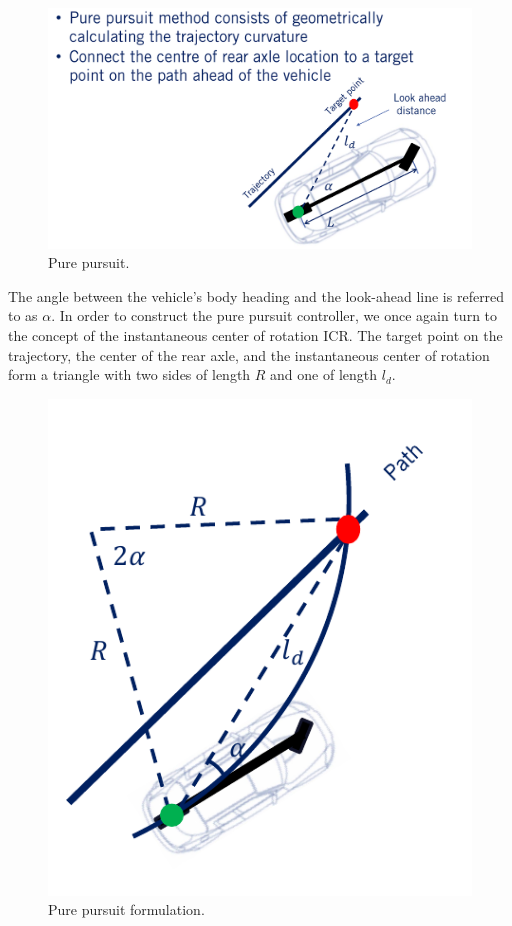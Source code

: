\begin{figure}[!htb]
\begin{center}
\includegraphics[scale=0.280]{img/lateral_control/pure_pursuit.jpeg}
\end{center}
\caption{Pure pursuit.}
\label{pure_pursuit}
\end{figure}

The angle between the vehicle's body heading and the look-ahead line is referred to as $\alpha$. In order to construct the pure pursuit controller, 
we once again turn to the concept of the instantaneous center of rotation ICR. 
The target point on the trajectory, the center of the rear axle, and the instantaneous center of rotation form a triangle with two sides of length $R$ and one of length $l_d$. 

\begin{figure}[!htb]
\begin{center}
\includegraphics[scale=0.280]{img/lateral_control/pure_pursuit_form_1.jpeg}
\end{center}
\caption{Pure pursuit formulation.}
\label{pure_pursuit_form_1}
\end{figure}


